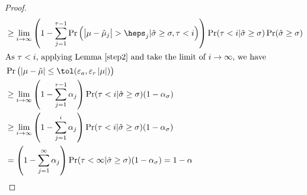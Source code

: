 \documentclass{iitthesis}
\begin{document}
\begin{proof}
\begin{align*}
&\geq \lim_{i\to \infty}\left (1-\sum_{j=1}^{\tau-1} \Pr\left(\abs{\mu-\hmu_j}> \heps_j|\hsigma \geq \sigma ,\tau < i\right)\right)\Pr(\tau< i|\hsigma \geq \sigma)\Pr(\hsigma\geq \sigma) \\
\intertext{As $\tau<i$, applying Lemma \ref{step2} and take the limit of $i \to \infty$, we have}
&\Pr\left (\abs{\mu-\tmu} \leq \tol(\varepsilon_a, \varepsilon_r \abs{\mu})\right) \\
&\geq \lim_{i\to \infty}\left ( 1-\sum_{j=1}^{\tau-1}\alpha_j\right)\Pr(\tau< i|\hsigma \geq \sigma)(1-\alpha_\sigma) \\
&\geq \lim_{i\to \infty}\left ( 1-\sum_{j=1}^{i}\alpha_j\right)\Pr(\tau< i|\hsigma \geq \sigma)(1-\alpha_\sigma)\\
& = \left(1-\sum_{j=1}^\infty\alpha_j\right)\Pr(\tau< \infty |\hsigma \geq \sigma)(1-\alpha_\sigma)= 1-\alpha
\end{align*}


\end{proof}
\end{document}
